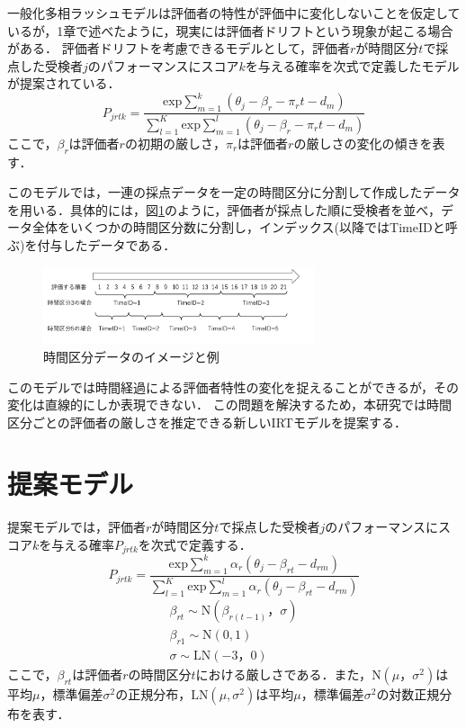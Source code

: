 \documentclass[dvipdfmx, twocolumn, a4paper]{hcresume}
\begin{document}
一般化多相ラッシュモデルは評価者の特性が評価中に変化しないことを仮定しているが，1章で述べたように，現実には評価者ドリフトという現象が起こる場合がある．
評価者ドリフトを考慮できるモデルとして，評価者$r$が時間区分$t$で採点した受検者$j$のパフォーマンスにスコア$k$を与える確率を次式で定義したモデルが提案されている\cite{Raudenbush}．
\begin{equation}
  P_{jrtk}=\frac{\mathrm{exp}\sum_{m=1}^{k}(\theta_{j}-\beta_{r} - \pi_{r}t-d_{m})}{\sum_{l=1}^{K}\mathrm{exp}\sum_{m=1}^{l}(\theta_{j}-\beta_{r} - \pi_{r}t-d_{m})}
\end{equation}
ここで，$\beta_{r}$は評価者$r$の初期の厳しさ，$\pi_{r}$は評価者$r$の厳しさの変化の傾きを表す．

このモデルでは，一連の採点データを一定の時間区分に分割して作成したデータを用いる．具体的には，図\ref{timeid}のように，評価者が採点した順に受検者を並べ，データ全体をいくつかの時間区分数に分割し，インデックス(以降ではTimeIDと呼ぶ)を付与したデータである．

\begin{figure}[t]
  \centering
  \includegraphics[width=8cm]{img/timeid.png}
  \caption{時間区分データのイメージと例}
  \label{timeid}
\end{figure}

このモデルでは時間経過による評価者特性の変化を捉えることができるが，その変化は直線的にしか表現できない．
この問題を解決するため，本研究では時間区分ごとの評価者の厳しさを推定できる新しいIRTモデルを提案する．
\section{提案モデル}
提案モデルでは，評価者$r$が時間区分$t$で採点した受検者$j$のパフォーマンスにスコア$k$を与える確率$P_{jrtk}$を次式で定義する．
\begin{equation}
  P_{jrtk}=\frac{\mathrm{exp}\sum^k_{m=1}{\alpha_r(\theta_{j}-\beta_{rt}-d_{rm})}}{\sum^K_{l=1} \mathrm{exp}\sum^l_{m=1}{\alpha_r(\theta_{j}-\beta_{rt}-d_{rm})}}
\end{equation}
\vspace{-5mm}
{\small
\begin{eqnarray}
  \beta_{rt}\sim \mathrm{N}(\beta_{r(t-1)}，\sigma)\nonumber\\
  \beta_{r1} \sim \mathrm{N}(0,1)\nonumber\\
  \sigma \sim \mathrm{LN}(-3，0)\nonumber
\end{eqnarray}
}
ここで，$\beta_{rt}$は評価者$r$の時間区分$t$における厳しさである．また，$\mathrm{N}(\mu，\sigma^2)$は平均$\mu$，標準偏差$\sigma^2$の正規分布，$\mathrm{LN}(\mu,\sigma^2)$は平均$\mu$，標準偏差$\sigma^2$の対数正規分布を表す．
\end{document}
